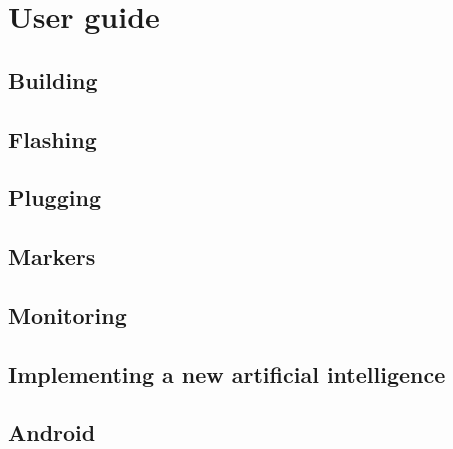 \documentclass[a4paper,11pt]{report}
\begin{document}
\chapter{User guide}

\section{Building}

\section{Flashing}
\label{sec:Flashing} %

\section{Plugging}

\section{Markers}

\section{Monitoring}

\section{Implementing a new artificial intelligence}

\section{Android}
\end{document}
